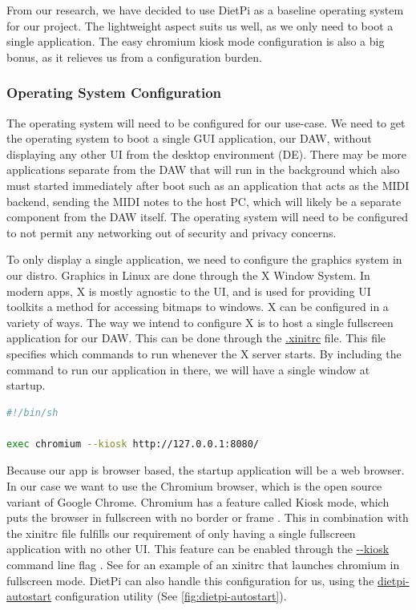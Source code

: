 From our research, we have decided to use DietPi as a baseline operating system for our
project. The lightweight aspect suits us well, as we only need to boot a single
application. The easy chromium kiosk mode configuration is also a big bonus, as it
relieves us from a configuration burden.

\subsubsection{Operating System Configuration}
\label{sec:research:subsec:os_config}

The operating system will need to be configured for our use-case. We need to get the
operating system to boot a single GUI application, our DAW, without displaying any other
UI from the desktop environment (DE). There may be more applications separate from the DAW
that will run in the background which also must started immediately after boot such as an
application that acts as the MIDI backend, sending the MIDI notes to the host PC, which
will likely be a separate component from the DAW itself. The operating system will need to
be configured to not permit any networking out of security and privacy concerns.

To only display a single application, we need to configure the graphics system in our
distro. Graphics in Linux are done through the X Window System. In modern apps, X is
mostly agnostic to the UI, and is used for providing UI toolkits a method for accessing
bitmaps to windows. X can be configured in a variety of ways. The way we intend to
configure X is to host a single fullscreen application for our DAW. This can be done
through the \url{.xinitrc} file. This file specifies which commands to run whenever the X
server starts. By including the command to run our application in there, we will have a
single window at startup.

\begin{lstlisting}[language=bash, label={lst:xinitrc}, caption=Example .xinitrc]
#!/bin/sh

exec chromium --kiosk http://127.0.0.1:8080/
\end{lstlisting}

Because our app is browser based, the startup application will be a web browser. In our
case we want to use the Chromium browser, which is the open source variant of Google
Chrome. Chromium has a feature called Kiosk mode, which puts the browser in fullscreen
with no border or frame \autocite{chromiumKioskMode}. This in combination with the xinitrc
file fulfills our requirement of only having a single fullscreen application with no other
UI. This feature can be enabled through the \url{--kiosk} command line flag
\autocite{chromiumKioskMode}. See  for an example of an xinitrc that
launches chromium in fullscreen mode. DietPi can also handle this configuration for us,
using the \url{dietpi-autostart} configuration utility (See
\autoref{fig:dietpi-autostart}).


